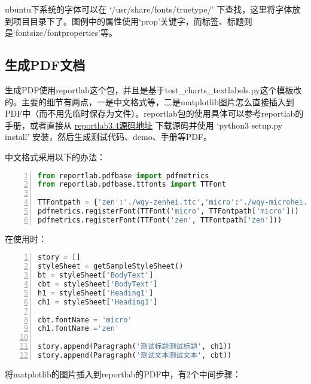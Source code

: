 ubuntu下系统的字体可以在 ‘/usr/share/fonts/truetype/’ 下查找，这里将字体放到项目目录下了。图例中的属性使用‘prop’关键字，而标签、标题则是‘fontsize/fontproperties’等。

\subsection{生成PDF文档}
生成PDF使用reportlab这个包，并且是基于test_charts_textlabels.py这个模板改的。主要的细节有两点，一是中文格式等，二是matplotlib图片怎么直接插入到PDF中（而不用先临时保存为文件）。reportlab包的使用具体可以参考reportlab的手册，或者直接从
\href{https://pypi.python.org/pypi/reportlab/3.4.0}{reportlab3.4源码地址}
下载源码并使用 ‘python3 setup.py install’ 安装，然后生成测试代码、demo、手册等PDF。

中文格式采用以下的办法：
\begin{lstlisting}[language=python,numbers=left,firstnumber = 1,breaklines = true,numberstyle=\tiny,keywordstyle=\color{blue!70},commentstyle=\color{red!50!green!50!blue!50},frame=shadowbox, rulesepcolor=\color{red!20!green!20!blue!20}]
from reportlab.pdfbase import pdfmetrics
from reportlab.pdfbase.ttfonts import TTFont

TTFontpath = {'zen':'./wqy-zenhei.ttc','micro':'./wqy-microhei.ttc'}
pdfmetrics.registerFont(TTFont('micro', TTFontpath['micro']))
pdfmetrics.registerFont(TTFont('zen', TTFontpath['zen']))
\end{lstlisting}
在使用时：
\begin{lstlisting}[language=python,numbers=left,firstnumber = 1,breaklines = true,numberstyle=\tiny,keywordstyle=\color{blue!70},commentstyle=\color{red!50!green!50!blue!50},frame=shadowbox, rulesepcolor=\color{red!20!green!20!blue!20}]
story = []
styleSheet = getSampleStyleSheet()
bt = styleSheet['BodyText']
cbt = styleSheet['BodyText']
h1 = styleSheet['Heading1']
ch1 = styleSheet['Heading1']

cbt.fontName = 'micro'
ch1.fontName ='zen'

story.append(Paragraph('测试标题测试标题', ch1))
story.append(Paragraph('测试文本测试文本', cbt))
\end{lstlisting}

将matplotlib的图片插入到reportlab的PDF中，有2个中间步骤：

